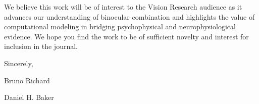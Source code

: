 \documentclass[12pt]{article}
\begin{document}
We believe this work will be of interest to the Vision Research audience as it advances our understanding of binocular combination and highlights the value of computational modeling in bridging psychophysical and neurophysiological evidence. We hope you find the work to be of sufficient novelty and interest for inclusion in the journal. 


Sincerely,

Bruno Richard
\vspace{-1em}

Daniel H. Baker
\end{document}
